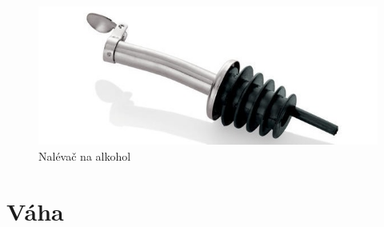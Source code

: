 \begin{figure}[!h]
    \begin{center}
        \includegraphics[scale=0.6]{obrazky/nalevac.jpg}
    \end{center}
    \label{nalevačos}
    \caption{Nalévač na alkohol \cite{nalevatko}}
\end{figure}

\section{Váha}

